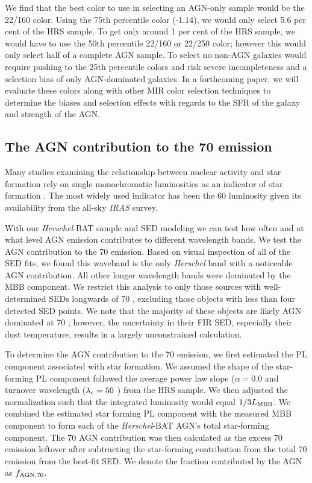 \documentclass[fleqn, usenatbib]{mnras}
\newcommand{\herschel}{\emph{Herschel}}
\begin{document}
We find that the best color to use in selecting an AGN-only sample would be the 22/160 color. Using the 75th percentile color (-1.14), we would only select 5.6 per cent of the HRS sample. To get only around 1 per cent of the HRS sample, we would have to use the 50th percentile 22/160 or 22/250 color; however this would only select half of a complete AGN sample. To select no non-AGN galaxies would require pushing to the 25th percentile colors and risk severe incompleteness and a selection bias of only AGN-dominated galaxies. In a forthcoming paper, we will evaluate these colors along with other MIR color selection techniques \cite[e.g.][]{Donley:2012qy, Stern:2012mz} to determine the biases and selection effects with regards to the SFR of the galaxy and strength of the AGN.

\subsection{The AGN contribution to the 70 \micron{} emission}\label{sec:agn_70_contribution}
Many studies examining the relationship between nuclear activity and star formation rely on single monochromatic luminosities as an indicator of star formation \cite[e.g.][]{Netzer:2007ve, Netzer:2009lr, Rosario:2012fr}. The most widely used indicator has been the 60 \micron{} luminosity given its availability from the all-sky \textit{IRAS} survey. 

With our \herschel-BAT sample and SED modeling we can test how often and at what level AGN emission contributes to different wavelength bands. We test the AGN contribution to the 70 \micron{} emission. Based on visual inspection of all of the SED fits, we found this waveband is the only \herschel{} band with a noticeable AGN contribution. All other longer wavelength bands were dominated by the MBB component. We restrict this analysis to only those sources with well-determined SEDs longwards of 70 \micron, excluding those objects with less than four detected SED points. We note that the majority of these objects are likely AGN dominated at 70 \micron; however, the uncertainty in their FIR SED, especially their dust temperature, results in a largely unconstrained calculation.

To determine the AGN contribution to the 70 \micron{} emission, we first estimated the PL component associated with star formation. We assumed the shape of the star-forming PL component followed the average power law slope ($\alpha=0.0$ and turnover wavelength ($\lambda_{\rm c} = 50$ \micron) from the HRS sample. We then adjusted the normalization such that the integrated luminosity would equal $1/3L_{\rm MBB}$. We combined the estimated star forming PL component with the measured MBB component to form each of the \herschel-BAT AGN's total star-forming component. The 70 \micron{} AGN contribution was then calculated as the excess 70 \micron{} emission leftover after subtracting the star-forming contribution from the total 70 \micron{} emission from the best-fit SED. We denote the fraction contributed by the AGN as $f_{\rm AGN, 70}$.
\end{document}
